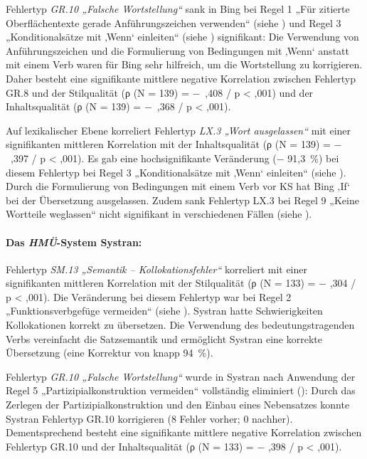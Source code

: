 Fehlertyp \textit{GR.10 „Falsche Wortstellung“} sank in Bing bei Regel 1 „Für zitierte Oberflächentexte gerade Anführungszeichen verwenden“ (siehe ) und Regel 3 „Konditionalsätze mit ‚Wenn‘ einleiten“ (siehe ) signifikant: Die Verwendung von Anführungszeichen und die Formulierung von Bedingungen mit ‚Wenn‘ anstatt mit einem Verb waren für Bing sehr hilfreich, um die Wortstellung zu korrigieren. Daher besteht eine signifikante mittlere negative Korrelation zwischen Fehlertyp GR.8 und der Stilqualität (ρ (N = 139) = $-$~,408 / p < ,001) und der Inhaltsqualität (ρ (N = 139) = $-$~,368 / p < ,001).

Auf lexikalischer Ebene korreliert Fehlertyp \textit{LX.3 „Wort ausgelassen“} mit einer signifikanten mittleren Korrelation mit der Inhaltsqualität (ρ (N = 139) = $-$~,397 / p < ,001). Es gab eine hochsignifikante Veränderung ($-$ 91,3~\%) bei diesem Fehlertyp bei Regel 3 „Konditionalsätze mit ‚Wenn‘ einleiten“ (siehe ). Durch die Formulierung von Bedingungen mit einem Verb vor KS hat Bing ‚If‘ bei der Übersetzung ausgelassen. Zudem sank Fehlertyp LX.3 bei Regel 9 „Keine Wortteile weglassen“ nicht signifikant in verschiedenen Fällen (siehe ).

\paragraph*{Das \textit{HMÜ}{}-System Systran:}
Fehlertyp \textit{SM.13 „Semantik -- Kollokationsfehler“} korreliert mit einer signifikanten mittleren Korrelation mit der Stilqualität (ρ (N = 133) = $-$ ,304 / p < ,001). Die Veränderung bei diesem Fehlertyp war bei Regel 2 „Funktionsverbgefüge vermeiden“ (siehe ). Systran hatte Schwierigkeiten Kollokationen korrekt zu übersetzen. Die Verwendung des bedeutungstragenden Verbs vereinfacht die Satzsemantik und ermöglicht Systran eine korrekte Übersetzung (eine Korrektur von knapp 94~\%).

Fehlertyp \textit{GR.10 „Falsche Wortstellung“} wurde in Systran nach Anwendung der Regel 5 „Partizipialkonstruktion vermeiden“ vollständig eliminiert (): Durch das Zerlegen der Partizipialkonstruktion und den Einbau eines Nebensatzes konnte Systran Fehlertyp GR.10 korrigieren (8 Fehler vorher; 0 nachher). Dementsprechend besteht eine signifikante mittlere negative Korrelation zwischen Fehlertyp GR.10 und der Inhaltsqualität (ρ (N = 133) = $-$ ,398 / p < ,001).

